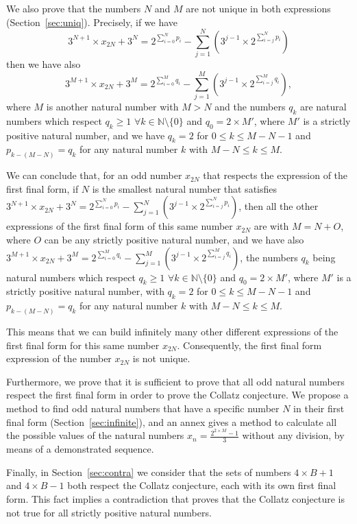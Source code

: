 \documentclass[11pt,a4paper]{article}
\newcommand{\N}{\mathbb{N}}
\newcommand{\Pf}[4]{2^{\sum_{#4=0}^{#1}#3_{#4}}-\sum_{j=1}^{#2}\left(3^{j-1}\times 2^{\sum_{#4=j}^{#1}#3_{#4}}\right)}
\theoremstyle{definition}
\begin{document}
We also prove that the numbers $N$ and $M$ are not unique in both expressions
(Section~\ref{sec:uniq}). Precisely, if we have
\[ 3^{N+1}\times x_{2N}+3^{N}=\Pf{N}{N}{p}{i}\]
then we have also
\[ 3^{M+1}\times x_{2N}+3^{M}=\Pf{M}{M}{q}{i},\]
where $M$ is another natural number with $M>N$ and the numbers $q_k$ are natural numbers
which respect $q_k\ge 1$ $\forall k\in\N\setminus\{0\}$ and $q_0=2\times M'$, where $M'$ is
a strictly positive natural number, and we have $q_k=2$ for $0\le k\le M-N-1$ and
$p_{k-(M-N)}=q_k$ for any natural number $k$ with $M-N\le k\le M$.

We can conclude that, for an odd number $x_{2N}$ that respects the expression of the
first final form, if $N$ is the smallest natural number that satisfies
$3^{N+1}\times x_{2N}+3^{N}=\Pf{N}{N}{p}{i}$, then all the other expressions of the first
final form of this same number $x_{2N}$ are with $M=N+O$, where $O$ can be any strictly
positive natural number, and we have also
$3^{M+1}\times x_{2N}+3^{M}=\Pf{M}{M}{q}{i}$, the numbers $q_k$ being natural numbers
which respect $q_k\ge 1$ $\forall k\in\N\setminus\{0\}$ and $q_0=2\times M'$, where $M'$ is
a strictly positive natural number, with $q_k=2$ for $0\le k\le M-N-1$ and
$p_{k-(M-N)}=q_k$ for any natural number $k$ with $M-N\le k\le M$.

This means that we can build infinitely many other different expressions of the first
final form for this same number $x_{2N}$. Consequently, the first final form expression
of the number $x_{2N}$ is not unique.

Furthermore, we prove that it is sufficient to prove that all odd natural numbers respect
the first final form in order to prove the Collatz conjecture. We propose a method to find
odd natural numbers that have a specific number $N$ in their first final form
(Section~\ref{sec:infinite}), and an annex gives a method to calculate all the possible
values of the natural numbers $x_n=\frac{2^{2\times M}-1}{3}$ without any division,
by means of a demonstrated sequence.

Finally, in Section~\ref{sec:contra} we consider that the sets of numbers $4\times B+1$
and $4\times B-1$ both respect the Collatz conjecture, each with its own first final form.
This fact implies a contradiction that proves that the Collatz conjecture is not true for
all strictly positive natural numbers.

\end{document}
